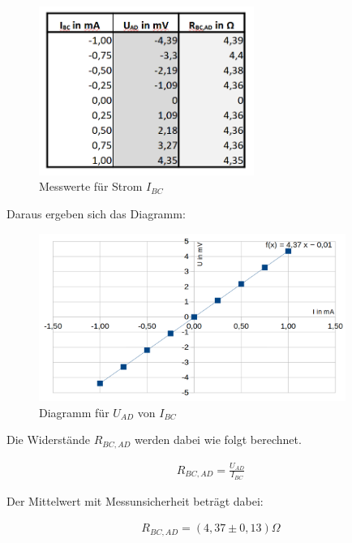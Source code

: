 \documentclass[a4paper]{scrartcl}
\numberwithin{equation}{subsection}
\begin{document}
\begin{figure}[H]
\includegraphics[width=7cm]{tabelle_messwerte_Ibc}
\centering
\caption{Messwerte für Strom $I_{BC}$}
\centering
\label{fig:tabelle-messwerte-Ibc}
\end{figure}

Daraus ergeben sich das Diagramm:

\begin{figure}[H]
\includegraphics[width=10cm]{diagramm_messwerte_Ibc-Uad}
\centering
\caption{Diagramm für $U_{AD}$ von $I_{BC}$}
\centering
\label{fig:diagramm_messwerte_Ibc-Uad}
\end{figure}

Die Widerstände $R_{BC,AD}$ werden dabei wie folgt berechnet.

\begin{align}
R_{BC,AD} = \frac{U_{AD}}{I_{BC}}
\end{align}

Der Mittelwert mit Messunsicherheit beträgt dabei:

\begin{align*}
R_{BC,AD} = (4,37 \pm 0,13)\Omega
\end{align*}
\end{document}
